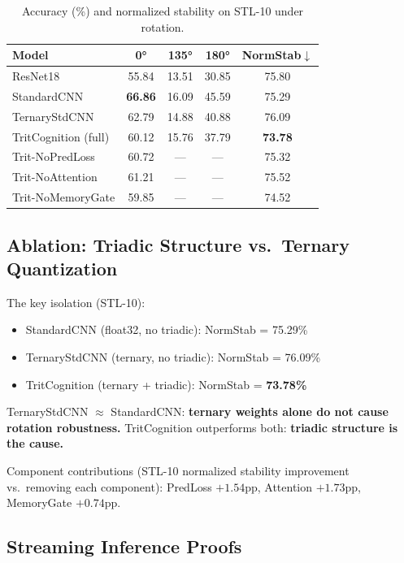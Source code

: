 \documentclass[10pt,twocolumn]{article}
\newcommand{\tritnet}{TritCognition}
\begin{document}
\begin{table}[H]
\centering\small
\caption{Accuracy (\%) and normalized stability on STL-10 under rotation.}
\begin{tabular}{lcccc}
\toprule
Model & 0° & 135° & 180° & NormStab$\downarrow$ \\ \midrule
ResNet18          & 55.84 & 13.51 & 30.85 & 75.80 \\
StandardCNN       & \textbf{66.86} & 16.09 & 45.59 & 75.29 \\
TernaryStdCNN     & 62.79 & 14.88 & 40.88 & 76.09 \\
\tritnet{} (full) & 60.12 & 15.76 & 37.79 & \textbf{73.78} \\
Trit-NoPredLoss   & 60.72 & ---   & ---   & 75.32 \\
Trit-NoAttention  & 61.21 & ---   & ---   & 75.52 \\
Trit-NoMemoryGate & 59.85 & ---   & ---   & 74.52 \\
\bottomrule
\end{tabular}
\end{table}

\subsection{Ablation: Triadic Structure vs.\ Ternary Quantization}

The key isolation (STL-10):
\begin{itemize}
  \item StandardCNN (float32, no triadic): NormStab = 75.29\%
  \item TernaryStdCNN (ternary, no triadic): NormStab = 76.09\%
  \item \tritnet{} (ternary + triadic): NormStab = \textbf{73.78\%}
\end{itemize}

TernaryStdCNN $\approx$ StandardCNN: \textbf{ternary weights alone do not
cause rotation robustness.} \tritnet{} outperforms both: \textbf{triadic
structure is the cause.}

Component contributions (STL-10 normalized stability improvement
vs.\ removing each component):
PredLoss $+1.54$pp, Attention $+1.73$pp, MemoryGate $+0.74$pp.

\subsection{Streaming Inference Proofs}
\end{document}
